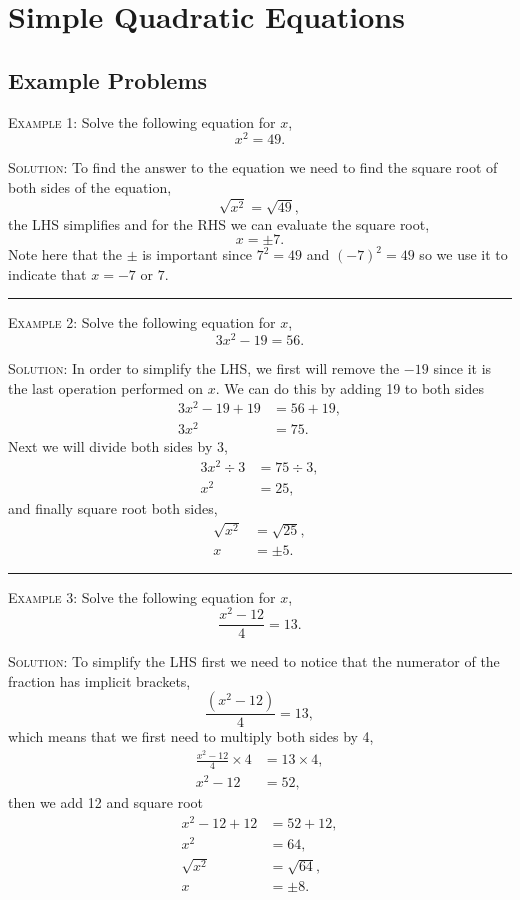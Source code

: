 \documentclass[a4paper,12pt]{article}
\begin{document}
\large
\section*{Simple Quadratic Equations}

\subsection*{Example Problems}

\textsc{Example 1}: Solve the following equation for $x$,
$$x^2 = 49.$$

\textsc{Solution}: To find the answer to the equation we need to
find the square root of both sides of the equation,
$$\sqrt{x^2} = \sqrt{49},$$
the LHS simplifies and for the RHS we can evaluate the square root,
$$x = \pm 7.$$
Note here that the $\pm$ is important since $7^2 = 49$ and 
$(-7)^2 = 49$ so we use it to indicate that $x = -7 \textrm{ or } 7$.

\vspace{3mm}
\hrule
\vspace{3mm}

\textsc{Example 2}: Solve the following equation for $x$,
$$3x^2 - 19 = 56.$$

\textsc{Solution}: In order to simplify the LHS, we first will 
remove the $-19$ since it is the last operation performed on $x$.
We can do this by adding 19 to both sides
\begin{align*}
3x^2 - 19 + 19 &= 56 + 19, \\
3x^2 &= 75.
\end{align*}
Next we will divide both sides by 3,
\begin{align*}
3x^2 \div 3 &= 75 \div 3, \\
x^2 &= 25,
\end{align*}
and finally square root both sides,
\begin{align*}
\sqrt{x^2} &= \sqrt{25}, \\
x &= \pm 5.
\end{align*}

\vspace{3mm}
\hrule
\vspace{3mm}

\textsc{Example 3}: Solve the following equation for $x$,
$$\frac{x^2 - 12}{4} = 13.$$

\textsc{Solution}: To simplify the LHS first we need to notice that
the numerator of the fraction has implicit brackets,
$$\frac{(x^2 - 12)}{4} = 13,$$
which means that we first need to multiply both sides by 4,
\begin{align*}
\frac{x^2 - 12}{4} \times 4 &= 13 \times 4, \\
x^2 - 12 &= 52,
\end{align*}
then we add 12 and square root
\begin{align*}
x^2 - 12 + 12 &= 52 + 12, \\
x^2 &= 64, \\
\sqrt{x^2} &= \sqrt{64}, \\
x &= \pm 8.
\end{align*}
\end{document}
